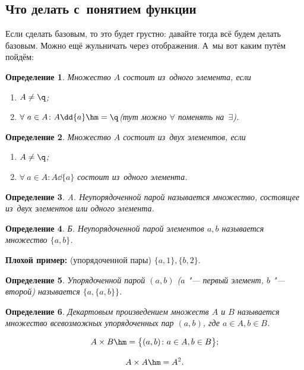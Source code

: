 \documentclass[a4paper,10pt,twoside]{article}
\newtheorem{Def}{Определение}[section]
\begin{document}
\subsection{Что делать с~понятием функции} Если сделать базовым, то это будет грустно: давайте тогда всё будем делать базовым.
 Можно ещё жульничать через отображения. А~мы вот каким путём пойдём:

\begin{Def}
    Множество $A$ состоит из~одного элемента, если

    \begin{enumerate}
        \item $A\neq\q$;
        \item $\forall\  a\in A\colon A\dd \{a\}\hm=\q$\pau (тут можно $\forall$ поменять на~$\exists$).
    \end{enumerate}
\end{Def}

\begin{Def}
    Множество $A$ состоит из~двух элементов, если

    \begin{enumerate}
        \item $A\neq\q$;

        \item $\forall\  a\in A\colon A\dd \{a\}$ состоит из~одного элемента.
    \end{enumerate}
\end{Def}

\begin{Def}A. Неупорядоченной парой называется множество, состоящее из~двух элементов или одного элемента.

\end{Def}

\begin{Def}Б. Неупорядоченной парой элементов $a,b$ называется множество $\{a,b\}$.
\end{Def}

\textbf{Плохой пример:} (упорядоченной пары) $\{a,1\},\{b,2\}$.

\begin{Def}
    Упорядоченной парой $(a,b)$ ($a$ "--- первый элемент, $b$ "--- второй) называется $\big\{a,\{a,b\}\big\}$.
\end{Def}

\begin{Def}
    Декартовым произведением множеств $A$ и $B$ называется множество всевозможных упорядоченных пар $(a,b)$, где $a\in A,b\in B$.

    \[
        A\times B\hm=\big\{(a,b)\colon a\in A,b\in B\big\};
    \]

    \[
        A\times A\hm=A^2.
    \]
\end{Def}
\end{document}
